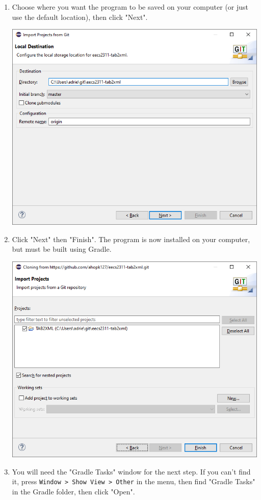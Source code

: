 \documentclass[11pt]{article}
\begin{document}
\begin{enumerate}
\begin{center}
\end{center}
\item Choose where you want the program to be saved on your computer (or just use the default location), then click "Next".
\begin{center}
\includegraphics[width=.9\linewidth]{./screenshot-eclipse-install-5.png}
\end{center}
\item Click "Next" then "Finish".  The program is now installed on your computer, but must be built using Gradle.
\begin{center}
\includegraphics[width=.9\linewidth]{./screenshot-eclipse-install-7.png}
\end{center}
\item You will need the "Gradle Tasks" window for the next step.  If you can't find it, press \texttt{Window > Show View > Other} in the menu, then find "Gradle Tasks" in the Gradle folder, then click "Open".

\end{enumerate}
\end{document}
